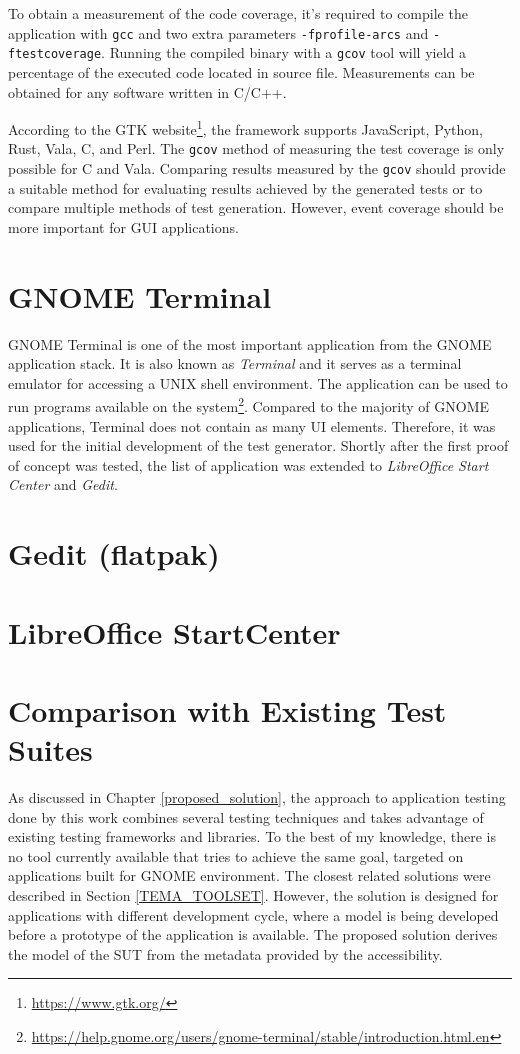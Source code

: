 To obtain a measurement of the code coverage, it's required to compile the application with \verb|gcc| and two extra parameters \verb|-fprofile-arcs| and \verb|-ftestcoverage|. Running the compiled binary with a \verb|gcov| tool will yield a percentage of the executed code located in source file. Measurements can be obtained for any software written in C/C++.\cite{gcov}

According to the GTK website\footnote{\url{https://www.gtk.org/}}, the framework supports JavaScript, Python, Rust, Vala, C, and Perl. The \verb|gcov| method of measuring the test coverage is only possible for C and Vala.    
Comparing results measured by the \verb|gcov| should provide a suitable method for evaluating results achieved by the generated tests or to compare multiple methods of test generation. However, event coverage should be more important for GUI applications.


\section{GNOME Terminal}
GNOME Terminal is one of the most important application from the GNOME application stack. It is also known as \textit{Terminal} and it serves as a terminal emulator for accessing a UNIX shell environment. The application can be used to run programs available on the system\footnote{\url{https://help.gnome.org/users/gnome-terminal/stable/introduction.html.en}}. Compared to the majority of GNOME applications, Terminal does not contain as many UI elements. Therefore, it was used for the initial development of the test generator. Shortly after the first proof of concept was tested, the list of application was extended to \textit{LibreOffice Start Center} and \textit{Gedit}. 


\section{Gedit (flatpak)}
\section{LibreOffice StartCenter}
\section{Comparison with Existing Test Suites}
As discussed in Chapter \ref{proposed_solution}, the approach to application testing done by this work combines several testing techniques and takes advantage of existing testing frameworks and libraries. To the best of my knowledge, there is no tool currently available that tries to achieve the same goal, targeted on applications built for GNOME environment. The closest related solutions were described in Section \ref{TEMA_TOOLSET}. However, the solution is designed for applications with different development cycle, where a model is being developed before a prototype of the application is available. The proposed solution derives the model of the SUT from the metadata provided by the accessibility.

